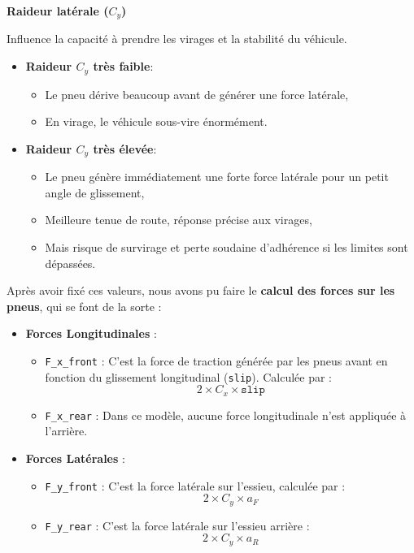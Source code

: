\textbf{Raideur latérale ($C_y$)}

Influence la capacité à prendre les virages et la stabilité du véhicule.

\begin{itemize}
\item \textbf{Raideur $C_y$ très faible}:
\begin{itemize}[label=$\star$]
\item Le pneu dérive beaucoup avant de générer une force latérale,
\item En virage, le véhicule sous-vire énormément.
\end{itemize}

\item \textbf{Raideur $C_y$ très élevée}:
\begin{itemize}[label=$\star$]
\item Le pneu génère immédiatement une forte force latérale pour un petit angle de glissement,
\item Meilleure tenue de route, réponse précise aux virages,
\item Mais risque de survirage et perte soudaine d’adhérence si les limites sont dépassées.
\end{itemize}
\end{itemize}

Après avoir fixé ces valeurs, nous avons pu faire le \textbf{calcul des forces sur les pneus}, qui se font de la sorte :
\begin{itemize}
\item \textbf{Forces Longitudinales} :
\begin{itemize}[label=$\star$]
\item \texttt{F\_x\_front} : C'est la force de traction générée par les pneus avant en fonction du glissement longitudinal (\texttt{slip}). Calculée par : $$2 \times C_x \times \texttt{slip}$$

\item \texttt{F\_x\_rear} : Dans ce modèle, aucune force longitudinale n'est appliquée à l'arrière.
\end{itemize}
\item \textbf{Forces Latérales} :
\begin{itemize}[label=$\star$]
\item \texttt{F\_y\_front} : C'est la force latérale sur l'essieu, calculée par : $$2 \times C_y \times a_F$$
\item \texttt{F\_y\_rear} : C'est la force latérale sur l'essieu arrière : $$2 \times C_y \times a_R$$
\end{itemize}
\end{itemize}

